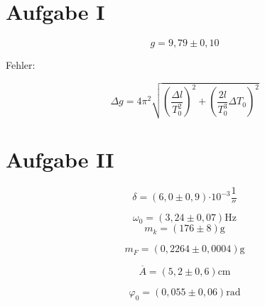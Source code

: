 \section{Aufgabe I}

\[g =9,79 \pm 0,10\]

Fehler:

\begin{equation}
    \Delta g = 4\pi^2 \sqrt{\left(\frac{\Delta l}{T_0^2}\right)^2 + \left(\frac{2l}{T_0^3}\Delta T_0\right)^2}
\end{equation}

\section{Aufgabe II}

\[ \delta = (6,0 \pm 0,9) \si{\cdot 10^{-3}\frac{1}{\second}}\]

\[ \omega_0 = (3,24 \pm 0,07) \si{\Hz} \]
\[m_k = (176 \pm 8) \si{\gram}\]

\[m_F = (0,2264 \pm 0,0004) \si{\gram}\]

\[ \overline{A} = (5,2 \pm 0,6) \si{\cm}\]

\[\varphi_0 =( 0,055 \pm 0,06 )\si{\text{rad}}\]